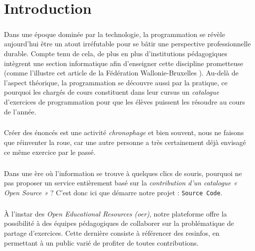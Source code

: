 \chapter{Introduction}

\paragraph{} Dans une époque dominée par la technologie, la programmation se révèle aujourd’hui être un atout irréfutable pour se bâtir une perspective professionnelle durable. Compte tenu de cela, de plus en plus d’institutions pédagogiques intègrent une section informatique afin d’enseigner cette discipline prometteuse (comme l'illustre cet article de la Fédération Wallonie-Bruxelles \cite{MAG_PROG}). Au-delà de l’aspect théorique, la programmation se découvre aussi par la pratique, ce pourquoi les chargés de cours constituent dans leur cursus un \textit{catalogue} d’exercices de programmation pour que les élèves puissent les résoudre au cours de l'année. 

\paragraph{} Créer des énoncés est une activité \textit{chronophage} et bien souvent, nous ne faisons que réinventer la roue, car une autre personne a très certainement déjà envisagé ce même exercice par le passé.

\paragraph{} Dans une ère où l’information se trouve à quelques clics de souris, pourquoi ne pas proposer un service entièrement basé sur la \textit{contribution d’un catalogue « Open Source »} ? C’est donc ici que démarre notre projet : \texttt{Source Code}.

\paragraph{} À l’instar des \textit{Open Educational Resources (\Gls{oer})}, notre plateforme offre la possibilité à des équipes pédagogiques de collaborer sur la problématique de partage d'exercices. Cette dernière consiste à référencer des \glspl{resinfo}, en permettant à un public varié de profiter de toutes contributions. 
